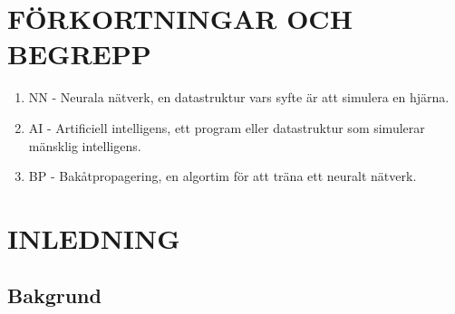 \documentclass[a4paper,10pt]{article}
\begin{document}
\begin{abstract}{}

\end{abstract}
\newpage
\tableofcontents
{}
\newpage
\section{FÖRKORTNINGAR OCH BEGREPP}

\begin{enumerate}[noitemsep]
\item NN - Neurala nätverk, en datastruktur vars syfte är att simulera en hjärna.
\item AI - Artificiell intelligens, ett program eller datastruktur som simulerar mänsklig intelligens.
\item BP - Bakåtpropagering, en algortim för att träna ett neuralt nätverk.
\end{enumerate}

\section{INLEDNING}





\subsection{Bakgrund}
\end{document}
